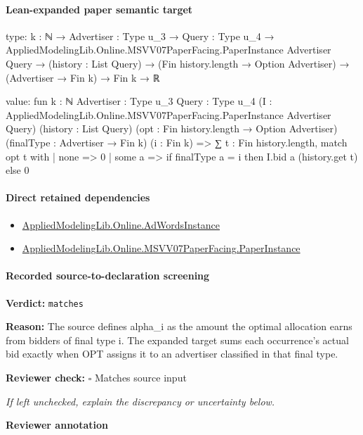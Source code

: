 \documentclass[10pt]{article}
\newcommand{\reviewerbox}{%
  \par\noindent\fbox{\parbox{0.96\linewidth}{\rule{0pt}{0.38in}}}\par
}
\newcommand{\reviewmatch}[1]{%
  \par\noindent\textbf{Reviewer check:} $\square$\; #1\par
  \noindent\emph{If left unchecked, explain the discrepancy or uncertainty below.}\par
}
\begin{document}
\paragraph{Lean-expanded paper semantic target}
\begin{ReviewVerbatim}
type:
{k : ℕ} →
  {Advertiser : Type u_3} →
    {Query : Type u_4} →
      AppliedModelingLib.Online.MSVV07PaperFacing.PaperInstance Advertiser Query →
        (history : List Query) → (Fin history.length → Option Advertiser) → (Advertiser → Fin k) → Fin k → ℝ

value:
fun {k : ℕ} {Advertiser : Type u_3} {Query : Type u_4}
    (I : AppliedModelingLib.Online.MSVV07PaperFacing.PaperInstance Advertiser Query) (history : List Query)
    (opt : Fin history.length → Option Advertiser) (finalType : Advertiser → Fin k) (i : Fin k) =>
  ∑ t : Fin history.length,
    match opt t with
    | none => 0
    | some a => if finalType a = i then I.bid a (history.get t) else 0
\end{ReviewVerbatim}

\paragraph{Direct retained dependencies}
\begin{itemize}\raggedright
\item \hyperlink{governing-declaration-e5ce49672bf26ab1}{Applied\allowbreak{}Modeling\allowbreak{}Lib.\allowbreak{}Online.\allowbreak{}Ad\allowbreak{}Words\allowbreak{}Instance}
\item \hyperlink{governing-declaration-11907576ec71eeb5}{Applied\allowbreak{}Modeling\allowbreak{}Lib.\allowbreak{}Online.\allowbreak{}MSVV07\allowbreak{}Paper\allowbreak{}Facing.\allowbreak{}Paper\allowbreak{}Instance}
\end{itemize}
\paragraph{Recorded source-to-declaration screening}
\textbf{Verdict:} \texttt{matches}
\\
{\raggedright
\textbf{Reason:} The source defines alpha\_\allowbreak{}i as the amount the optimal allocation earns from bidders of final type i.\allowbreak{} The expanded target sums each occurrence's actual bid exactly when OPT assigns it to an advertiser classified in that final type.\allowbreak{}
\par}
\reviewmatch{Matches source input}
\noindent\textbf{Reviewer annotation}\par
\reviewerbox
\clearpage
\hypertarget{paper-prerequisite-4e8b0193699d2745}{}
\end{document}
